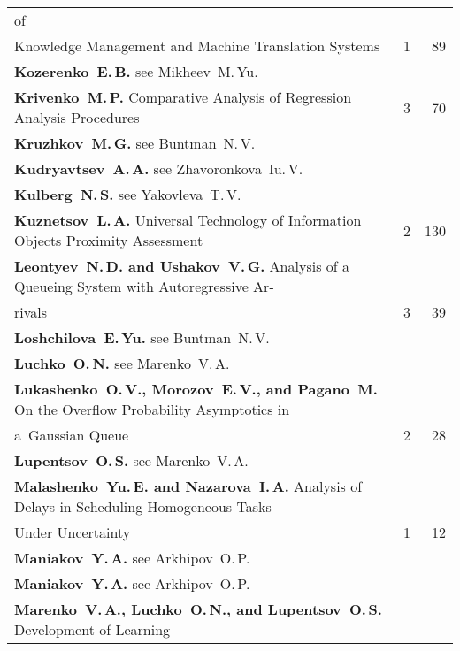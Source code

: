 {\begin{tabular}{p{397pt}rr}
of\linebreak
\vspace*{-12pt}\\
\hspace*{23pt}Knowl\-edge Management and Machine Translation Systems\dotfill&1&89\\
\textbf{Kozerenko~E.\,B.} see Mikheev~M.\,Yu.&&\\
\textbf{Krivenko~M.\,P.} Comparative Analysis of Regression Analysis Procedures\dotfill&3&70\\
\textbf{Kruzhkov~M.\,G.} see Buntman~N.\,V.&&\\
\textbf{Kudryavtsev~A.\,A.} see Zhavoronkova~Iu.\,V.&&\\
\textbf{Kulberg~N.\,S.} see Yakovleva~T.\,V.&&\\
\textbf{Kuznetsov~L.\,A.} Universal Technology of Information Objects Proximity
Assessment\dotfill&2&130\\
\textbf{Leontyev~N.\,D. and Ushakov~V.\,G.} Analysis of a Queueing System with
Autoregressive Ar-\linebreak
\vspace*{-12pt}\\
\hspace*{23pt}rivals\dotfill&3&39\\
\textbf{Loshchilova~E.\,Yu.} see Buntman~N.\,V.&&\\
\textbf{Luchko~O.\,N.} see Marenko~V.\,A.&&\\
\textbf{Lukashenko~O.\,V., Morozov~E.\,V., and Pagano~M.} On the Overflow Probability
Asymptotics in\linebreak
\vspace*{-12pt}\\
\hspace*{23pt}a~Gaussian Queue\dotfill&2&28\\
\textbf{Lupentsov~O.\,S.} see Marenko~V.\,A.&&\\
\textbf{Malashenko~Yu.\,E. and Nazarova~I.\,A.} Analysis of Delays in Scheduling
Homogeneous Tasks\linebreak
\vspace*{-12pt}\\
\hspace*{23pt}Under Uncertainty\dotfill&1&12\\
\textbf{Maniakov~Y.\,A.} see Arkhipov~O.\,P.&&\\
\textbf{Maniakov~Y.\,A.} see Arkhipov~O.\,P.&&\\
\textbf{Marenko~V.\,A., Luchko~O.\,N., and Lupentsov~O.\,S.} Development of Learning

\end{tabular}}
